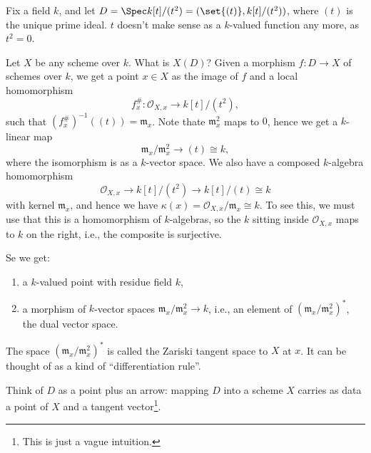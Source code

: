 Fix a field $k$, and let $D = \Spec k[t]/(t^2) = (\set{(t)}, k[t]/(t^2))$, where $(t)$ is
the unique prime ideal.
$t$ doesn't make sense as a $k$-valued function any more, as $t^2 = 0$.

Let $X$ be any scheme over $k$. What is $X(D)$? Given a morphism $f\colon D\to X$
of schemes over $k$, we get a point $x \in X$ as the image of $f$ and a local
homomorphism
\[ f^\#_x\colon \mathcal{O}_{X, x}\to k[t]/(t^2), \]
such that $(f^\#_x)^{-1}((t)) = \mathfrak{m}_x$. Note thate $\mathfrak{m}_x^2$ maps
to $0$, hence we get a $k$-linear map
\[ \mathfrak{m}_x/\mathfrak{m}_x^2 \to (t)\cong k, \]
where the isomorphism is as a $k$-vector space. We also have a composed $k$-algebra
homomorphism
\[ \mathcal{O}_{X, x} \to k[t]/(t^2)\to k[t]/(t) \cong k \]
with kernel $\mathfrak{m}_x$, and hence we have $\kappa(x) = \mathcal{O}_{X, x}/\mathfrak{m}_x \cong k$.
To see this, we must use that this is a homomorphism of $k$-algebras, so the $k$ sitting inside
$\mathcal{O}_{X, x}$ maps to $k$ on the right, i.e., the composite is surjective.

Se we get:
\begin{enumerate}
	\item a $k$-valued point with residue field $k$,
	\item a morphism of $k$-vector spaces $\mathfrak{m}_x/\mathfrak{m}_x^2\to k$,
		i.e., an element of $(\mathfrak{m}_x/\mathfrak{m}_x^2)^*$, the dual vector space.
\end{enumerate}

The space $(\mathfrak{m}_x/\mathfrak{m}_x^2)^*$ is called the Zariski tangent space
to $X$ at $x$. It can be thought of as a kind of \enquote{differentiation rule}.

Think of $D$ as a point plus an arrow: mapping $D$ into a scheme $X$ carries as
data a point of $X$ and a tangent vector\footnote{This is just a vague intuition.}.

